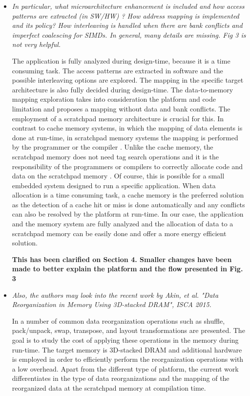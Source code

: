 \documentclass[12pt,a4paper,notitlepage]{article}
\begin{document}
\begin{itemize}

\item \textit{In particular, what microarchitecture enhancement is included and how access patterns are extracted (in SW/HW) ?  How address mapping is implemented and its policy?  How interleaving is handled when there are bank conflicts and imperfect coalescing for SIMDs.  In general,  many details are missing.  Fig 3 is not very helpful.}

The application is fully analyzed during design-time, because it is a time consuming task. 
The access patterns are extracted in software and the possible interleaving options are explored. 
The mapping in the specific target architecture is also fully decided during design-time.
The data-to-memory mapping exploration takes into consideration the platform and code limitation and proposes a mapping without data and bank conflicts.
The employment of a scratchpad memory architecture is crucial for this.
In contrast to cache memory systems, in which the mapping of data elements is done at run-time, in scratchpad memory systems the mapping is performed by the programmer or the compiler \cite{ishitobi2007code}. 
Unlike the cache memory, the scratchpad memory does not need tag search operations and it is the responsibility of the programmers or compilers to correctly allocate code and data on the scratchpad memory \cite{steinke2002assigning}.
Of course, this is possible for a small embedded system designed to run a specific application. 
When data allocation is a time consuming task, a cache memory is the preferred solution as the detection of a cache hit or miss is done automatically and any conflicts can also be resolved by the platform at run-time.
In our case, the application and the memory system are fully analyzed and the allocation of data to a scratchpad memory can be easily done and offer a more energy efficient solution.

\textbf{This has been clarified on Section 4. Smaller changes have been made to better explain the platform and the flow presented in Fig. 3}

\item \textit{Also, the authors may look into the recent work by Akin, et al. "Data Reorganization in Memory Using 3D-stacked DRAM", ISCA 2015.}

In \cite{3D} a number of common data reorganization operations such as shuffle, pack/unpack, swap, transpose, and layout transformations are presented. 
The goal is to study the cost of applying these operations in the memory during run-time. The target memory is 3D-stacked DRAM and additional hardware is employed in order to efficiently perform the reorganization operations with a low overhead. 
Apart from the different type of platform, the current work differentiates in the type of data reorganizations and the mapping of the reorganized data at the scratchpad memory at compilation time. 


\end{itemize}
\end{document}
